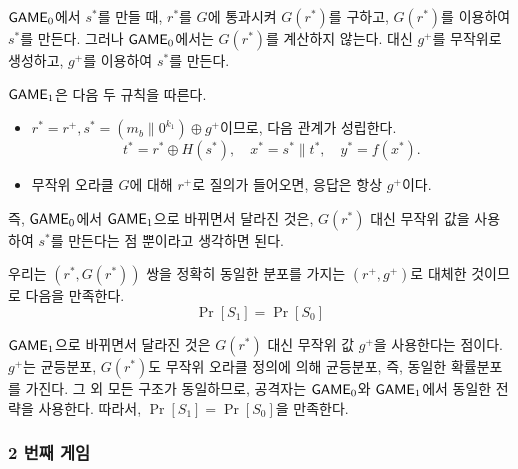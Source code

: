 \begin{memo}
	$\textsf{GAME}_0$에서 $s^*$를 만들 때, $r^*$를 $G$에 통과시켜 $G(r^*)$를 구하고,
	$G(r^*)$를 이용하여 $s^*$를 만든다. 그러나 $\textsf{GAME}_0$에서는 $G(r^*)$를
	계산하지 않는다. 대신 $g^+$를 무작위로 생성하고, $g^+$를 이용하여 $s^*$를
	만든다.
\end{memo}

$\textsf{GAME}_1$은 다음 두 규칙을 따른다.
\begin{itemize}
	\item $r^* = r^+, s^* = (m_b \parallel 0^{k_1}) \oplus g^+$이므로, 다음
	관계가 성립한다.
	$$
		t^* = r^* \oplus H(s^*), \quad
		x^* = s^* \parallel t^*, \quad
		y^* = f(x^*).
	$$
	\item 무작위 오라클 $G$에 대해 $r^+$로 질의가 들어오면, 응답은 항상 $g^+$이다.
\end{itemize}

\begin{memo}
	즉, $\textsf{GAME}_0$에서 $\textsf{GAME}_1$으로 바뀌면서 달라진 것은, $G(r^*)$ 대신 무작위
	값을 사용하여 $s^*$를 만든다는 점 뿐이라고 생각하면 된다.
\end{memo}

우리는 $(r^*, G(r^*))$ 쌍을 정확히 동일한 분포를 가지는 $(r^+, g^+)$로 대체한
것이므로 다음을 만족한다.
$$
	\Pr[S_1] = \Pr[S_0]
$$

\begin{memo}
	$\textsf{GAME}_1$으로 바뀌면서 달라진 것은 $G(r^*)$ 대신 무작위 값 $g^+$을
	사용한다는 점이다. $g^+$는 균등분포, $G(r^*)$도 무작위 오라클 정의에 의해
	균등분포, 즉, 동일한 확률분포를 가진다. 그 외 모든 구조가 동일하므로,
	공격자는 $\textsf{GAME}_0$와 $\textsf{GAME}_1$에서 동일한 전략을 사용한다. 따라서, $\Pr[S_1]
	= \Pr[S_0]$을 만족한다.
\end{memo}

\newpage
\subsubsection{2 번째 게임}

